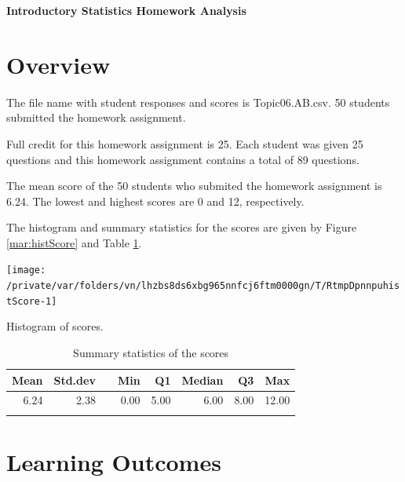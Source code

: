 \documentclass[12pt,english,nohyper]{tufte-handout}\usepackage[]{graphicx}\usepackage[]{color}
\newenvironment{knitrout}{}{} %
\begin{document}
\setcaptionfont{
  \normalfont\footnotesize
  \color{black}
}





\centerline{\Large\bf Introductory Statistics Homework Analysis}


\section{Overview}
The file name with student responses and scores is Topic06.AB.csv. 50 students submitted the homework assignment.

Full credit for this homework assignment is 25. Each student was given 25 questions and this homework assignment contains a total of 89 questions.  

The mean score of the 50 students who submited the homework assignment is 6.24. The lowest and highest scores are 0 and 12, respectively.

The histogram and summary statistics for the scores are given by Figure \ref{mar:histScore} and Table \ref{tab:summary}.

\begin{knitrout}
\color{fgcolor}\begin{marginfigure}
\texttt{[image: /private/var/folders/vn/lhzbs8ds6xbg965nnfcj6ftm0000gn/T/RtmpDpnnpuhistScore-1]} \caption[Histogram of scores]{Histogram of scores.}\label{mar:histScore}
\end{marginfigure}


\end{knitrout}

\begin{longtable}{rrlrrrrr}
  \hline
Mean & Std.dev &   & Min & Q1 & Median & Q3 & Max \\ 
  \hline
6.24 & 2.38 &  & 0.00 & 5.00 & 6.00 & 8.00 & 12.00 \\ 
   \hline
\hline
\caption{Summary statistics of the scores} 
\label{tab:summary}
\end{longtable}


\clearpage
\newpage{}
\section{Learning Outcomes}

\bigskip{}
\end{document}
